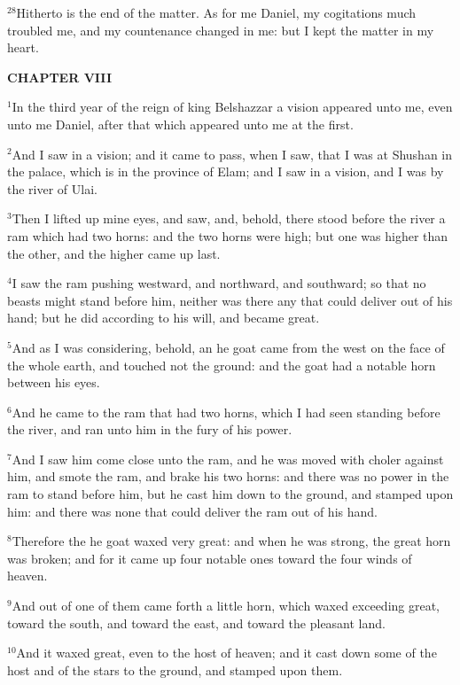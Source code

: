 \documentclass[12pt]{article}
\begin{document}
$^{28}$Hitherto is the end of the matter. As for me Daniel, my
cogitations much troubled me, and my countenance changed in me: but I
kept the matter in my heart.





\begin{center}
\textbf{\small CHAPTER VIII}
\end{center}
$^{1}$In the third year of the reign of king Belshazzar a vision
appeared unto me, even unto me Daniel, after that which appeared unto
me at the first.


$^{2}$And I saw in a vision; and it came to pass, when I saw, that I was
at Shushan in the palace, which is in the province of Elam; and I saw
in a vision, and I was by the river of Ulai.


$^{3}$Then I lifted up mine eyes, and saw, and, behold, there stood
before the river a ram which had two horns: and the two horns were
high; but one was higher than the other, and the higher came up last.


$^{4}$I saw the ram pushing westward, and northward, and southward; so
that no beasts might stand before him, neither was there any that
could deliver out of his hand; but he did according to his will, and
became great.


$^{5}$And as I was considering, behold, an he goat came from the west on
the face of the whole earth, and touched not the ground: and the goat
had a notable horn between his eyes.


$^{6}$And he came to the ram that had two horns, which I had seen
standing before the river, and ran unto him in the fury of his power.


$^{7}$And I saw him come close unto the ram, and he was moved with
choler against him, and smote the ram, and brake his two horns: and
there was no power in the ram to stand before him, but he cast him
down to the ground, and stamped upon him: and there was none that
could deliver the ram out of his hand.


$^{8}$Therefore the he goat waxed very great: and when he was strong,
the great horn was broken; and for it came up four notable ones toward
the four winds of heaven.


$^{9}$And out of one of them came forth a little horn, which waxed
exceeding great, toward the south, and toward the east, and toward the
pleasant land.


$^{10}$And it waxed great, even to the host of heaven; and it cast down
some of the host and of the stars to the ground, and stamped upon
them.
\end{document}
